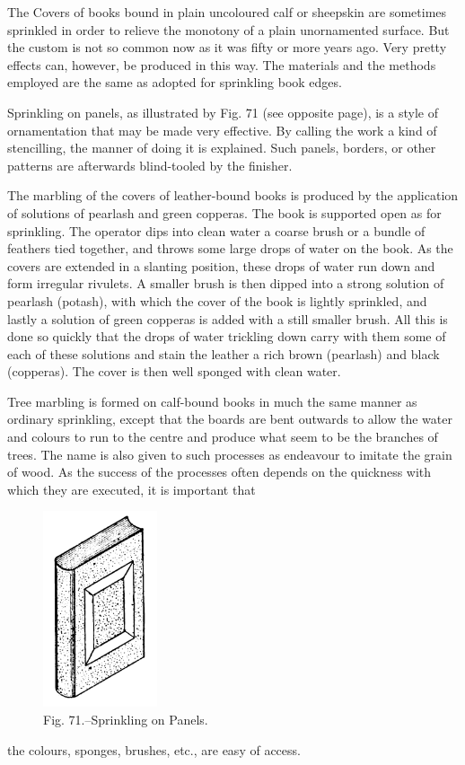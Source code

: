 \documentclass[twoside]{book}
\begin{document}
\noindent
The Covers of books bound in plain uncoloured calf
or sheepskin are sometimes sprinkled in order to
relieve the monotony of a plain unornamented surface.
But the custom is not so common now as it
was fifty or more years ago. Very pretty effects
can, however, be produced in this way. The
materials and the methods employed are the same
as adopted for sprinkling book edges.

Sprinkling on panels, as illustrated by Fig. 71
(see opposite page), is a style of ornamentation that
may be made very effective. By calling the work
a kind of stencilling, the manner of doing it is
explained. Such panels, borders, or other patterns
are afterwards blind-tooled by the finisher.

The marbling of the covers of leather-bound
books is produced by the application of solutions
of pearlash and green copperas. The book is
supported open as for sprinkling. The operator dips
into clean water a coarse brush or a bundle of
feathers tied together, and throws some large drops
of water on the book. As the covers are extended
in a slanting position, these drops of water run
down and form irregular rivulets. A smaller brush
is then dipped into a strong solution of pearlash
(potash), with which the cover of the book is lightly
sprinkled, and lastly a solution of green copperas
is added with a still smaller brush. All this is
done so quickly that the drops of water trickling
down carry with them some of each of these solutions
and stain the leather a rich brown (pearlash)
and black (copperas). The cover is then well
sponged with clean water.

\pagebreak

Tree marbling is formed on calf-bound books in
much the same manner as ordinary sprinkling,
except that the boards are bent outwards to allow
the water and colours to run to the centre and
produce what seem to be the branches of trees.
The name is also given to such processes as
endeavour to imitate the grain of wood. As the success
of the processes often depends on the quickness
with which they are executed, it is important that
	\begin{figure}[h]
		\centering
		\includegraphics[width=0.3\textwidth]{Figures/_071.png}
		\caption*{Fig. 71.--Sprinkling on Panels.}
	\end{figure}
the colours, sponges, brushes, etc., are easy of
access.
\end{document}
